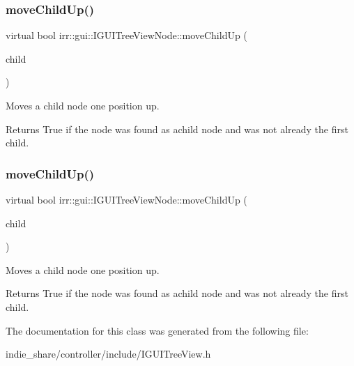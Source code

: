 \subsubsection{\texorpdfstring{move\+Child\+Up()}{moveChildUp()}\hspace{0.1cm}{\footnotesize\ttfamily [1/2]}}
{\footnotesize\ttfamily virtual bool irr\+::gui\+::\+I\+G\+U\+I\+Tree\+View\+Node\+::move\+Child\+Up (\begin{DoxyParamCaption}\item[{\hyperlink{classirr_1_1gui_1_1IGUITreeViewNode}{I\+G\+U\+I\+Tree\+View\+Node} $\ast$}]{child }\end{DoxyParamCaption})\hspace{0.3cm}{\ttfamily [pure virtual]}}



Moves a child node one position up. 

\begin{DoxyReturn}{Returns}
True if the node was found as achild node and was not already the first child. 
\end{DoxyReturn}
\mbox{\label{classirr_1_1gui_1_1IGUITreeViewNode_a9e55b868695250c09e53e5fa961a812c}} 
\subsubsection{\texorpdfstring{move\+Child\+Up()}{moveChildUp()}\hspace{0.1cm}{\footnotesize\ttfamily [2/2]}}
{\footnotesize\ttfamily virtual bool irr\+::gui\+::\+I\+G\+U\+I\+Tree\+View\+Node\+::move\+Child\+Up (\begin{DoxyParamCaption}\item[{\hyperlink{classirr_1_1gui_1_1IGUITreeViewNode}{I\+G\+U\+I\+Tree\+View\+Node} $\ast$}]{child }\end{DoxyParamCaption})\hspace{0.3cm}{\ttfamily [pure virtual]}}



Moves a child node one position up. 

\begin{DoxyReturn}{Returns}
True if the node was found as achild node and was not already the first child. 
\end{DoxyReturn}


The documentation for this class was generated from the following file\+:\begin{DoxyCompactItemize}
\item 
indie\+\_\+share/controller/include/I\+G\+U\+I\+Tree\+View.\+h\end{DoxyCompactItemize}
